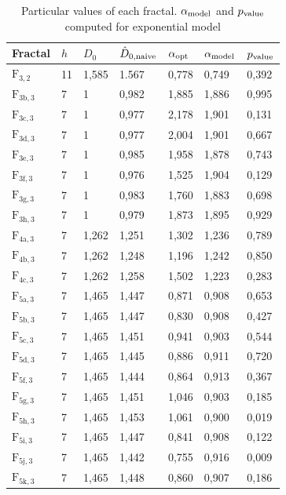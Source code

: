 \begin{table}[]
\centering
\caption{Particular values of each fractal. $\alpha_{\mbox{\scriptsize{model}}}$ and $p_{\mbox{\scriptsize{value}}}$ computed for exponential model}
\vspace{2mm}
\label{tab:table1}
\begin{tabular}{|l||l|l||l|l||l|l|}
\hline
Fractal & $h$ & $D_{0}$ & $\hat{D}_{0,\mbox{\scriptsize{naive}}}$ & $\alpha_{\mbox{\scriptsize{opt}}}$ & $\alpha_{\mbox{\scriptsize{model}}}$ & $p_{\mbox{\scriptsize{value}}}$ \\ \hline \hline
$\mathrm{F_{3,2}}$ & 11 & 1,585 & 1.567 & 0,778 & 0,749 &	0,392  \\
$\mathrm{F_{3b,3}}$ & 7 & 1 & 0,982 & 1,885 & 1,886	& 0,995 \\
$\mathrm{F_{3c,3}}$ & 7 & 1 & 0,977 & 2,178 & 1,901	& 0,131 \\
$\mathrm{F_{3d,3}}$ & 7 & 1 & 0,977 & 2,004 &  1,901	& 0,667  \\
$\mathrm{F_{3e,3}}$ & 7 & 1 & 0,985 & 1,958 &  1,878	& 0,743  \\
$\mathrm{F_{3f,3}}$ & 7 & 1 & 0,976 & 1,525 &  1,904	& 0,129  \\
$\mathrm{F_{3g,3}}$ & 7 & 1 & 0,983 & 1,760 &  1,883	& 0,698  \\
$\mathrm{F_{3h,3}}$ & 7 & 1 & 0,979 & 1,873 &  1,895 &	0,929  \\
$\mathrm{F_{4a,3}}$ & 7 & 1,262 & 1,251 & 1,302 &  1,236	& 0,789  \\
$\mathrm{F_{4b,3}}$ & 7 & 1,262 & 1,248 & 1,196 &  1,242	& 0,850  \\
$\mathrm{F_{4c,3}}$ & 7 & 1,262 & 1,258 & 1,502 &  1,223	& 0,283  \\
$\mathrm{F_{5a,3}}$ & 7 & 1,465 & 1,447 & 0,871 &  0,908	& 0,653  \\
$\mathrm{F_{5b,3}}$ & 7 & 1,465 & 1,447 & 0,830 &  0,908	& 0,427  \\
$\mathrm{F_{5c,3}}$ & 7 & 1,465 & 1,451 & 0,941 &  0,903	& 0,544  \\
$\mathrm{F_{5d,3}}$ & 7 & 1,465 & 1,445 & 0,886 &  0,911	& 0,720  \\
$\mathrm{F_{5f,3}}$ & 7 & 1,465 & 1,444 & 0,864 &  0,913	& 0,367  \\
$\mathrm{F_{5g,3}}$ & 7 & 1,465 & 1,451 & 1,046 &  0,903	& 0,185  \\
$\mathrm{F_{5h,3}}$ & 7 & 1,465 & 1,453 & 1,061 &  0,900	& 0,019  \\
$\mathrm{F_{5i,3}}$ & 7 & 1,465 & 1,447 & 0,841 &  0,908	& 0,122  \\
$\mathrm{F_{5j,3}}$ & 7 & 1,465 & 1,442 & 0,755 &  0,916	& 0,009  \\
$\mathrm{F_{5k,3}}$ & 7 & 1,465 & 1,448 & 0,860 &  0,907 & 0,186  \\ \hline
\end{tabular}
\end{table}

